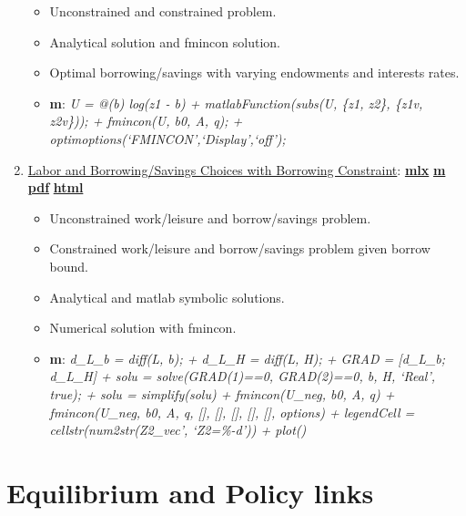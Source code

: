 \documentclass[
]{book}
\providecommand{\tightlist}{%
  \setlength{\itemsep}{0pt}\setlength{\parskip}{0pt}}
\begin{document}
\begin{enumerate}
  \begin{itemize}
  \tightlist
  \item
    Unconstrained and constrained problem.
  \item
    Analytical solution and fmincon solution.
  \item
    Optimal borrowing/savings with varying endowments and interests rates.
  \item
    \textbf{m}: \emph{U = @(b) log(z1 - b) + matlabFunction(subs(U, \{z1, z2\}, \{z1v, z2v\})); + fmincon(U, b0, A, q); + optimoptions(`FMINCON',`Display',`off');}
  \end{itemize}
\item
  \href{https://Math4Econ.github.io/opti_hh_constrained_brsv_inequality/htmlpdfm/household_asset_labor_constrained.html}{Labor and Borrowing/Savings Choices with Borrowing Constraint}: \href{https://github.com/Math4Econ/Math4Econ.github.io/blob/main/opti_hh_constrained_brsv_inequality/household_asset_labor_constrained.mlx}{\textbf{mlx}} \textbar{} \href{https://github.com/Math4Econ/Math4Econ.github.io/blob/main/opti_hh_constrained_brsv_inequality/htmlpdfm/household_asset_labor_constrained.m}{\textbf{m}} \textbar{} \href{https://github.com/Math4Econ/Math4Econ.github.io/blob/main/opti_hh_constrained_brsv_inequality/htmlpdfm/household_asset_labor_constrained.pdf}{\textbf{pdf}} \textbar{} \href{https://Math4Econ.github.io/opti_hh_constrained_brsv_inequality/htmlpdfm/household_asset_labor_constrained.html}{\textbf{html}}

  \begin{itemize}
  \tightlist
  \item
    Unconstrained work/leisure and borrow/savings problem.
  \item
    Constrained work/leisure and borrow/savings problem given borrow bound.
  \item
    Analytical and matlab symbolic solutions.
  \item
    Numerical solution with fmincon.
  \item
    \textbf{m}: \emph{d\_L\_b = diff(L, b); + d\_L\_H = diff(L, H); + GRAD = {[}d\_L\_b; d\_L\_H{]} + solu = solve(GRAD(1)==0, GRAD(2)==0, b, H, `Real', true); + solu = simplify(solu) + fmincon(U\_neg, b0, A, q) + fmincon(U\_neg, b0, A, q, {[}{]}, {[}{]}, {[}{]}, {[}{]}, {[}{]}, options) + legendCell = cellstr(num2str(Z2\_vec', `Z2=\%-d')) + plot()}
  \end{itemize}
\end{enumerate}

\hypertarget{equilibrium-and-policy-links}{%
\section{Equilibrium and Policy links}\label{equilibrium-and-policy-links}}
\end{document}
